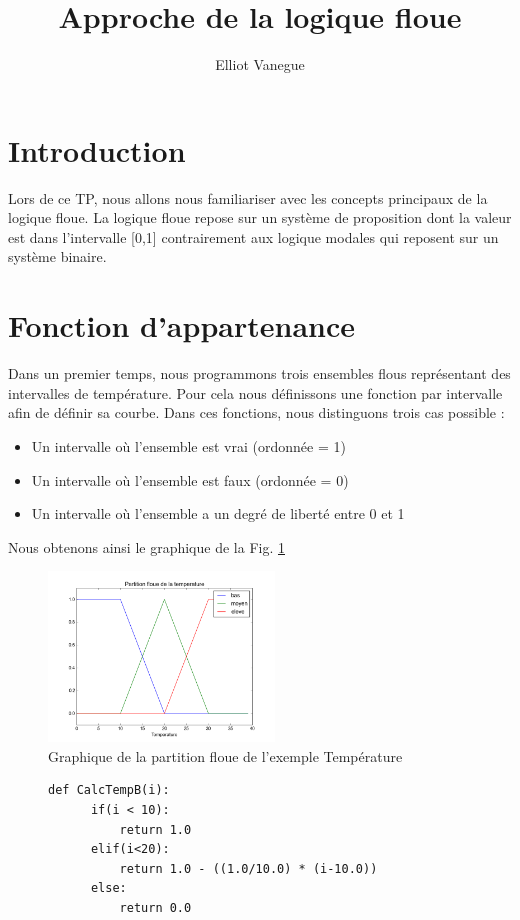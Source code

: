 \documentclass[a4paper,11pt]{article}
\title{Approche de la logique floue}
\author{Elliot Vanegue}
\begin{document}
\maketitle

\section{Introduction}
Lors de ce TP, nous allons nous familiariser avec les concepts principaux de la logique floue.
La logique floue repose sur un système de proposition dont la valeur est dans l'intervalle [0,1] contrairement aux logique
modales qui reposent sur un système binaire. 

\section{Fonction d'appartenance}
Dans un premier temps, nous programmons trois ensembles flous représentant des intervalles de température.
Pour cela nous définissons une fonction par intervalle afin de définir sa courbe. Dans ces fonctions, nous 
distinguons trois cas possible :
\begin{itemize}
  \item Un intervalle où l'ensemble est vrai (ordonnée = 1)
  \item Un intervalle où l'ensemble est faux (ordonnée = 0)
  \item Un intervalle où l'ensemble a un degré de liberté entre 0 et 1
\end{itemize}
Nous obtenons ainsi le graphique de la Fig. \ref{fig:GraphiqueFlou} 

\begin{figure}[!h]
  \begin{center}
    \includegraphics[width=6cm]{tempFlou.png}
    \caption{Graphique de la partition floue de l'exemple \og Température \fg}
    \label{fig:GraphiqueFlou}
  \end{center}
\end{figure}

\begin{figure}
  \begin{lstlisting}[caption=Fonction de l'ensemble température basse]
    def CalcTempB(i):
      if(i < 10):
          return 1.0
      elif(i<20):
          return 1.0 - ((1.0/10.0) * (i-10.0))
      else:
          return 0.0
  \end{lstlisting}
\end{figure}
\end{document}
